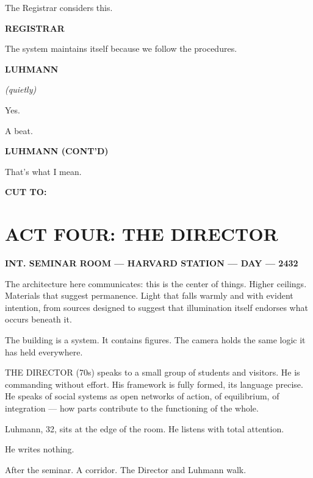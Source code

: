 \documentclass[12pt]{article}
\newcommand{\sceneheading}[1]{%
  \vspace{10pt}%
  \noindent\textbf{#1}%
  \vspace{6pt}%
}
\newcommand{\trans}[1]{%
  \vspace{8pt}%
  \begin{flushright}\textbf{#1}\end{flushright}%
  \vspace{4pt}%
}
\newcommand{\character}[1]{%
  \vspace{8pt}%
  \begin{center}\textbf{#1}\end{center}%
  \vspace{-4pt}%
}
\newcommand{\paren}[1]{%
  \begin{center}\textit{(#1)}\end{center}%
  \vspace{-4pt}%
}
\newenvironment{dialogue}{%
  \begin{center}%
  \begin{minipage}{0.62\textwidth}%
}{%
  \end{minipage}%
  \end{center}%
  \vspace{4pt}%
}
\newenvironment{action}{%
  \vspace{4pt}%
  \noindent\ignorespaces%
}{%
  \vspace{6pt}%
}
\begin{document}
\begin{action}
The Registrar considers this.
\end{action}

\character{REGISTRAR}
\begin{dialogue}
The system maintains itself because we follow the procedures.
\end{dialogue}

\character{LUHMANN}
\paren{quietly}
\begin{dialogue}
Yes.
\end{dialogue}

\begin{action}
A beat.
\end{action}

\character{LUHMANN (CONT'D)}
\begin{dialogue}
That's what I mean.
\end{dialogue}

\trans{CUT TO:}


\section*{ACT FOUR: THE DIRECTOR}

\sceneheading{INT. SEMINAR ROOM — HARVARD STATION — DAY — 2432}

\begin{action}
The architecture here communicates: this is the center of things. Higher ceilings. Materials that suggest permanence. Light that falls warmly and with evident intention, from sources designed to suggest that illumination itself endorses what occurs beneath it.

\medskip

The building is a system. It contains figures. The camera holds the same logic it has held everywhere.

\medskip

THE DIRECTOR (70s) speaks to a small group of students and visitors. He is commanding without effort. His framework is fully formed, its language precise. He speaks of social systems as open networks of action, of equilibrium, of integration — how parts contribute to the functioning of the whole.

\medskip

Luhmann, 32, sits at the edge of the room. He listens with total attention.

He writes nothing.

\medskip

After the seminar. A corridor. The Director and Luhmann walk.
\end{action}
\end{document}

